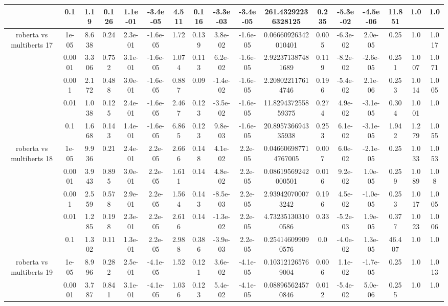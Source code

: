\begin{tabular}{|c|c|c|c|c|c|c|c|c|c|c|c|c|c|c|c|c|}
 & 0.1 & 1.19 & 0.126 & 1.1e-01 & -3.4e-05 & 4.511 & 0.116 & -3.3e-03 & -3.4e-05 & 261.43292236328125 & 0.235 & -5.3e-02 & -4.5e-06 & 11.851 & 1.0 & 1.0 \\
\hline
\multirow{5}{*}{roberta  vs multiberts 17} & 1e-05 & 8.638 & 0.24 & 2.3e-01 & -1.6e-05 & 1.72 & 0.139 & 3.8e-02 & -1.6e-05 & 0.06660926342010401 & 0.005 & -6.3e-02 & 2.0e-05 & 0.25 & 1.0 & 1.017 \\
 & 0.0001 & 3.306 & 0.752 & 3.1e-01 & -1.6e-05 & 1.074 & 0.113 & 6.2e-02 & -1.6e-05 & 2.922371387481689 & 0.119 & -8.2e-02 & -2.6e-05 & 0.251 & 1.007 & 1.071 \\
 & 0.001 & 2.172 & 0.488 & 3.0e-01 & -1.6e-05 & 0.887 & 0.09 & -1.4e-02 & -1.6e-05 & 2.208022117614746 & 0.196 & -5.4e-02 & 2.1e-06 & 0.253 & 1.014 & 1.005 \\
 & 0.01 & 1.038 & 0.125 & 2.4e-01 & -1.6e-05 & 2.467 & 0.123 & -3.5e-02 & -1.6e-05 & 11.829437255859375 & 0.274 & 4.9e-02 & -3.1e-05 & 0.304 & 1.001 & 1.0 \\
 & 0.1 & 1.668 & 0.143 & 1.4e-01 & -1.6e-05 & 6.865 & 0.123 & 9.8e-03 & -1.6e-05 & 20.895736694335938 & 0.253 & 6.1e-02 & -3.1e-05 & 1.942 & 1.279 & 1.055 \\
\hline
\multirow{5}{*}{roberta  vs multiberts 18} & 1e-05 & 9.936 & 0.21 & 2.4e-01 & 2.2e-05 & 2.666 & 0.148 & 4.1e-02 & 2.2e-05 & 0.046606987714767005 & 0.007 & 6.0e-02 & -2.1e-05 & 0.25 & 1.033 & 1.053 \\
 & 0.0001 & 3.943 & 0.895 & 3.0e-01 & 2.2e-05 & 1.611 & 0.14 & 4.8e-02 & 2.2e-05 & 0.08619569242000501 & 0.016 & 9.2e-02 & 1.0e-05 & 0.259 & 1.089 & 1.08 \\
 & 0.001 & 2.559 & 0.578 & 2.9e-01 & 2.2e-05 & 1.564 & 0.143 & -8.5e-03 & 2.2e-05 & 2.939420700073242 & 0.196 & 4.5e-02 & -1.0e-05 & 0.253 & 1.017 & 1.005 \\
 & 0.01 & 1.285 & 0.198 & 2.3e-01 & 2.2e-05 & 2.616 & 0.14 & -1.3e-02 & 2.2e-05 & 4.732351303100586 & 0.33 & -5.2e-03 & 1.9e-05 & 0.377 & 1.023 & 1.006 \\
 & 0.1 & 1.302 & 0.11 & 1.3e-01 & 2.2e-05 & 2.988 & 0.386 & -3.9e-03 & 2.2e-05 & 0.254146099090576 & 0.0 & -4.0e-02 & 1.3e-05 & 46.407 & 1.0 & 1.0 \\
\hline
\multirow{5}{*}{roberta  vs multiberts 19} & 1e-05 & 8.996 & 0.282 & 2.5e-01 & -4.1e-05 & 1.52 & 0.121 & 3.6e-02 & -4.1e-05 & 0.103121265769004 & 0.006 & 1.1e-02 & -1.7e-05 & 0.25 & 1.0 & 1.013 \\
 & 0.0001 & 3.787 & 0.841 & 3.1e-01 & -4.1e-05 & 1.036 & 0.123 & 5.4e-02 & -4.1e-05 & 0.088965624570846 & 0.012 & -5.4e-02 & 5.0e-06 & 0.255 & 1.0 & 1.0 \\

\end{tabular}
